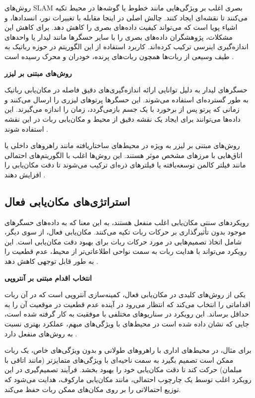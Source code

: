 روش‌های SLAM بصری اغلب بر ویژگی‌هایی مانند خطوط یا گوشه‌ها در محیط تکیه می‌کنند تا نقشه‌ای ایجاد کنند. چالش اصلی در اینجا مقابله با تغییرات نور، انسدادها، و اشیاء پویا است که می‌تواند کیفیت داده‌های بصری را کاهش دهد. برای کاهش این مشکلات، پژوهشگران داده‌های بصری را با سایر حسگرها مانند لیدار یا واحدهای اندازه‌گیری اینرسی ترکیب کرده‌اند. کاربرد استفاده از این الگوریتم در حوزه رباتیک به طیف وسیعی از ربات‌ها همچون ربات‌های پرنده، خودران و محرک رسیده است
\cite{guan2021robot, khairuddin2015review, choset2001topological}.

\textbf{روش‌های مبتنی بر لیزر}

حسگرهای لیدار به دلیل توانایی ارائه اندازه‌گیری‌های دقیق فاصله در مکان‌یابی رباتیک به طور گسترده‌ای استفاده می‌شوند. این حسگرها پرتوهای لیزری را ارسال می‌کنند و زمانی که پرتو پس از برخورد با یک جسم بازمی‌گردد، زمان را اندازه می‌گیرند. این داده‌ها می‌توانند برای ایجاد یک نقشه دقیق از محیط و مکان‌یابی ربات در این نقشه استفاده شوند
 \cite{xu2019indoor}.

روش‌های مبتنی بر لیزر به ویژه در محیط‌های ساختاریافته مانند راهروهای داخلی یا اتاق‌هایی با مرزهای مشخص موثر هستند. این روش‌ها اغلب با الگوریتم‌های احتمالی مانند فیلتر کالمن توسعه‌یافته یا فیلترهای ذره‌ای ترکیب می‌شوند تا دقت مکان‌یابی را افزایش دهند
 \cite{liu2022improved, blok2019robot}.

\subsection{استراتژی‌های مکان‌یابی فعال}

رویکردهای سنتی مکان‌یابی اغلب منفعل هستند، به این معنا که به داده‌های حسگرهای موجود بدون تأثیرگذاری بر حرکات ربات تکیه می‌کنند. مکان‌یابی فعال، از سوی دیگر، شامل اتخاذ تصمیم‌هایی در مورد حرکات ربات برای بهبود دقت مکان‌یابی است. این رویکرد می‌تواند با هدایت ربات به سمت نواحی اطلاعاتی‌تر از محیط، عدم قطعیت را به طور قابل توجهی کاهش دهد
\cite{burgard1997active}.

\textbf{انتخاب اقدام مبتنی بر آنتروپی}

یکی از روش‌های کلیدی در مکان‌یابی فعال، کمینه‌سازی آنتروپی است که در آن ربات اقداماتی را انتخاب می‌کند که انتظار می‌رود در آینده عدم قطعیت در موقعیت آن را به حداقل برساند. این رویکرد در سناریوهای مختلفی با موفقیت به کار گرفته شده است، جایی که نشان داده شده است در محیط‌های با ویژگی‌های مبهم، عملکرد بهتری نسبت به روش‌های منفعل دارد
\cite{burgard1997active2}.

برای مثال، در محیط‌های اداری با راهروهای طولانی و بدون ویژگی‌های خاص، یک ربات ممکن است تصمیم بگیرد به سمت ناحیه‌ای با ویژگی‌های متمایزتر (مانند اتاقی با مبلمان) حرکت کند تا دقت مکان‌یابی خود را بهبود بخشد. فرآیند تصمیم‌گیری در این رویکرد اغلب توسط یک چارچوب احتمالی، مانند مکان‌یابی مارکوف، هدایت می‌شود که توزیع احتمالاتی را بر روی مکان‌های ممکن ربات حفظ می‌کند.

